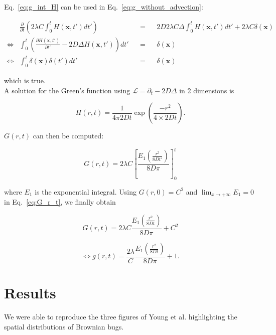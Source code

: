 Eq.~\ref{eq:g_int_H} can be used in Eq.~\ref{eq:g_without_advection}:

\begin{align}
 & \frac{\partial}{\partial t}\left(2\lambda C\int_{0}^{t}H(\boldsymbol{x},t')dt'\right) & & = & & 2D2\lambda C\Delta\int_{0}^{t}H(\boldsymbol{x},t')dt'+2\lambda C\delta(\boldsymbol{x})\\
\Leftrightarrow & \int_{0}^{t}\left(\frac{\partial H(\boldsymbol{x},t')}{\partial t'}-2D\Delta H(\boldsymbol{x},t')\right)dt' & & = & & \delta(\boldsymbol{x})\\
\Leftrightarrow & \int_{0}^{t}\delta(\boldsymbol{x})\delta(t')dt' & & = & & \delta(\boldsymbol{x})
\end{align}

which is true. \\

A solution for the Green's function using $\mathcal{L}=\partial_{t}-2D\Delta$
in 2 dimensions is 

\begin{equation}
H(r,t)=\frac{1}{4\pi2Dt}\exp\left(\frac{-r^{2}}{4\times2Dt}\right). 
\end{equation}

$G(r,t)$ can then be computed:

\begin{equation}
G(r,t)=2\lambda C\left[\frac{E_1 \left(\frac{r^{2}}{8Dt'}\right)}{8D\pi}\right]_{0}^{t}\label{eq:G_r_t}
\end{equation}

where $E_1$ is the exponential integral. Using $G(r,0)=C^{2}$ and
$\lim_{x\rightarrow+\infty}E_1=0$ in Eq.~\ref{eq:G_r_t}, we finally obtain

\begin{equation}
G(r,t)=2\lambda C\frac{E_1\left(\frac{r^{2}}{8Dt}\right)}{8D\pi}+C^{2}
\end{equation}

\begin{equation}
\Leftrightarrow g(r,t)=\frac{2\lambda}{C}\frac{E_1\left(\frac{r^{2}}{8Dt}\right)}{8D\pi}+1.
\end{equation}

\section*{Results}

We were able to reproduce the three figures of Young et al. \cite{young_reproductive_2001} highlighting the spatial distributions of Brownian bugs.\\

